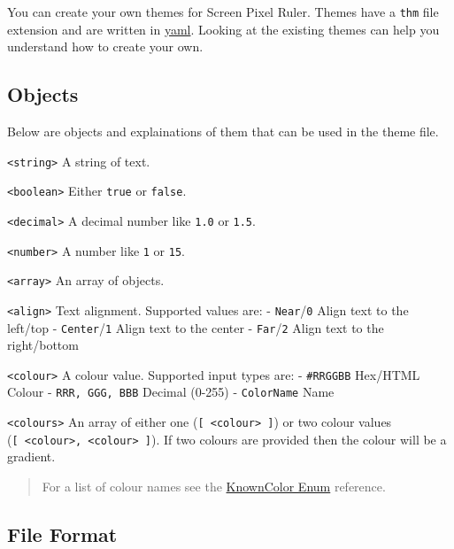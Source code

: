 \documentclass[
]{book}
\begin{document}
You can create your own themes for Screen Pixel Ruler.
Themes have a \texttt{thm} file extension and are written in \href{https://yaml.org}{yaml}.
Looking at the existing themes can help you understand how to create your own.

\subsection{Objects}\label{objects}

Below are objects and explainations of them that can be used in the theme file.

\texttt{\textless{}string\textgreater{}} A string of text.

\texttt{\textless{}boolean\textgreater{}} Either \texttt{true} or \texttt{false}.

\texttt{\textless{}decimal\textgreater{}} A decimal number like \texttt{1.0} or \texttt{1.5}.

\texttt{\textless{}number\textgreater{}} A number like \texttt{1} or \texttt{15}.

\texttt{\textless{}array\textgreater{}} An array of objects.

\texttt{\textless{}align\textgreater{}} Text alignment.
Supported values are:
- \texttt{Near}/\texttt{0} Align text to the left/top
- \texttt{Center}/\texttt{1} Align text to the center
- \texttt{Far}/\texttt{2} Align text to the right/bottom

\texttt{\textless{}colour\textgreater{}} A colour value.
Supported input types are:
- \texttt{\textquotesingle{}\#RRGGBB\textquotesingle{}} Hex/HTML Colour
- \texttt{RRR,\ GGG,\ BBB} Decimal (0-255)
- \texttt{ColorName} Name

\texttt{\textless{}colours\textgreater{}} An array of either one (\texttt{{[}\ \textless{}colour\textgreater{}\ {]}}) or two colour values (\texttt{{[}\ \textless{}colour\textgreater{},\ \textless{}colour\textgreater{}\ {]}}).
If two colours are provided then the colour will be a gradient.

\begin{quote}
For a list of colour names see the \href{https://docs.microsoft.com/en-us/dotnet/api/system.drawing.knowncolor?view=netcore-3.1}{KnownColor Enum} reference.
\end{quote}

\subsection{File Format}\label{file-format}
\end{document}
